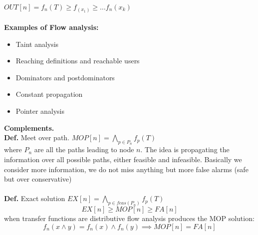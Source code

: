 \documentclass[10pt,a4paper]{article}
\begin{document}
$OUT[n] = f_n(T) \geq f_(x_1) \geq \hdots f_n(x_k)$\\\\
\textbf{Examples of Flow analysis:}
\begin{itemize}
\item Taint analysis
\item Reaching definitions and reachable users
\item Dominators and postdominators
\item Constant propagation
\item Pointer analysis
\end{itemize}
\newpage
\textbf{Complements.}\\
\textbf{Def.} Meet over path. $MOP[n] = \bigwedge_{p\in P_n}f_p(T)$ \\where $P_n$ are all the paths leading to node $n$. The idea is propagating the information over all possible paths, either feasible and infeasible. Basically we consider more information, we do not miss anything but more false alarms (safe but over conservative)\\\\
\textbf{Def.} Exact solution $EX[n] = \bigwedge_{p \in feas(P_n)}f_p(T)$\\
$$ EX[n] \geq MOP[n] \geq FA[n]$$
when transfer functions are distributive  flow analysis produces the MOP solution:
$$ f_n(x \wedge y) = f_n(x) \wedge f_n(y) \implies MOP[n] = FA[n] $$
\end{document}
